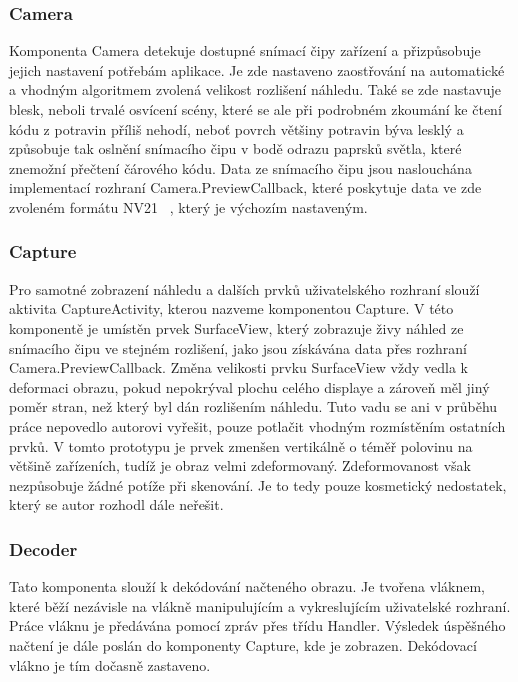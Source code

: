 \documentclass[thesis=B,czech]{FITthesis}[2013/10/20]
\begin{document}
\subsubsection{Camera}

Komponenta Camera detekuje dostupné snímací čipy zařízení a přizpůsobuje jejich nastavení potřebám aplikace. Je zde nastaveno zaostřování na automatické a vhodným algoritmem zvolená velikost rozlišení náhledu. Také se zde nastavuje blesk, neboli trvalé osvícení scény, které se ale při podrobném zkoumání ke čtení kódu z potravin příliš nehodí, neboť povrch většiny potravin býva lesklý a způsobuje tak oslnění snímacího čipu v bodě odrazu paprsků světla, které znemožní přečtení čárového kódu. Data ze snímacího čipu jsou naslouchána implementací rozhraní Camera.PreviewCallback, které poskytuje data ve zde zvoleném formátu NV21 ~\cite{nv21}, který je výchozím nastaveným.

\subsubsection{Capture}

Pro samotné zobrazení náhledu a dalších prvků uživatelského rozhraní slouží aktivita CaptureActivity, kterou nazveme komponentou Capture. V této komponentě je umístěn prvek SurfaceView, který zobrazuje živy náhled ze snímacího čipu ve stejném rozlišení, jako jsou získávána data přes rozhraní Camera.PreviewCallback. Změna velikosti prvku SurfaceView vždy vedla k deformaci obrazu, pokud nepokrýval plochu celého displaye a zároveň měl jiný poměr stran, než který byl dán rozlišením náhledu. Tuto vadu se ani v průběhu práce nepovedlo autorovi vyřešit, pouze potlačit vhodným rozmístěním ostatních prvků. V tomto prototypu je prvek zmenšen vertikálně o téměř polovinu na většině zařízeních, tudíž je obraz velmi zdeformovaný. Zdeformovanost však nezpůsobuje žádné potíže při skenování. Je to tedy pouze kosmetický nedostatek, který se autor rozhodl dále neřešit.

\subsubsection{Decoder}

Tato komponenta slouží k dekódování načteného obrazu. Je tvořena vláknem, které běží nezávisle na vlákně manipulujícím a vykreslujícím uživatelské rozhraní. Práce vláknu je předávána pomocí zpráv přes třídu Handler. Výsledek úspěšného načtení je dále poslán do komponenty Capture, kde je zobrazen. Dekódovací vlákno je tím dočasně zastaveno.
\end{document}
